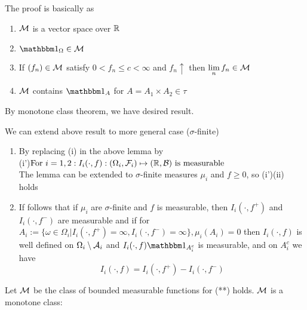 The proof is basically as  
\begin{enumerate} 
    \item $\mathcal{M}$ is a vector space over $\mathbb{R}$
    \item $\I_\Omega \in \M$ 
    \item If $(f_n)\in \mathcal{M}$ satisfy $0 < f_n \leq c < \infty$ and $f_n \uparrow$ then $\lim\limits_{n} f_n \in \mathcal{M}$
    \item $\mathcal{M}$ contains $\I_A$ for $A = A_1 \times A_2 \in \tau$
\end{enumerate}By monotone class theorem, we have desired result.
\begin{rem}We can extend above result to more general case ($\sigma$-finite)
\begin{enumerate}
    \item By replacing (i) in the above lemma by \\
    (i')$\text{For } i=1,2: I_i(\cdot, f): (\Omega_i, \mathcal{F}_i) \mapsto (\mathbb{R}, \mathcal{B}) \text{ is measurable}$ \\
    The lemma can be extended to $\sigma$-finite measures $\mu_i$ and $f \geq 0$, so (i')(ii) holds
    \item If follows that if $\mu_i$ are $\sigma$-finite and $f$ is measurable, then $I_i(\cdot, f^+)$ and $I_i(\cdot, f^-)$ are measurable and if for $A_i:= \{\omega\in \Omega_i|I_i(\cdot, f^+) = \infty, I_i(\cdot, f^-)=\infty \}, \mu_i(A_i) = 0$ then $I_i(\cdot, f)$ is well defined on $\Omega_i \setminus \mathcal{A}_i$ and $I_i(\cdot, f)\I_{A_i^c}$ is measurable, and on $A_i^c$ we have 
    \begin{equation*}
        I_i(\cdot, f) = I_i(\cdot, f^+) - I_i(\cdot, f^-)
    \end{equation*}
\end{enumerate}
\end{rem}
\newpage
\pf Let $\mathcal{M}$ be the class of bounded measurable functions for (**) holds. $\mathcal{M}$ is a monotone class:
